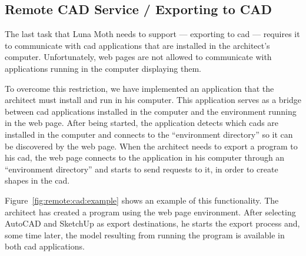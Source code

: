 

\subsection{Remote CAD Service / Exporting to CAD}
The last task that Luna Moth needs to support --- exporting to \gls{cad} --- requires it to communicate with \gls{cad} applications that are installed in the architect's computer.
Unfortunately, web pages are not allowed to communicate with applications running in the computer displaying them.

To overcome this restriction, we have implemented an application that the architect must install and run in his computer.
This application serves as a bridge between \gls{cad} applications installed in the computer and the environment running in the web page.
After being started, the application detects which \glspl{cad} are installed in the computer and connects to the ``environment directory'' so it can be discovered by the web page.
When the architect needs to export a program to his \gls{cad}, the web page connects to the application in his computer through an ``environment directory'' and starts to send requests to it, in order to create shapes in the \gls{cad}.

Figure~\ref{fig:remote:cad:example} shows an example of this functionality.
The architect has created a program using the web page environment.
After selecting AutoCAD and SketchUp as export destinations, he starts the export process and, some time later, the model resulting from running the program is available in both \gls{cad} applications.




